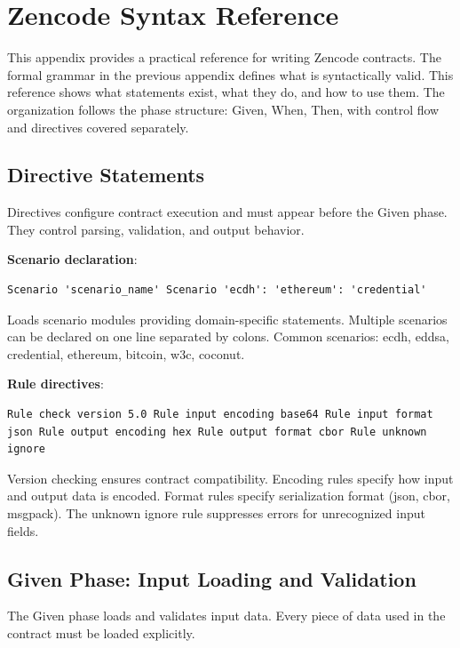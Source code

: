 \section{Zencode Syntax Reference}

This appendix provides a practical reference for writing Zencode
contracts. The formal grammar in the previous appendix defines what is
syntactically valid. This reference shows what statements exist, what
they do, and how to use them. The organization follows the phase
structure: Given, When, Then, with control flow and directives covered
separately.

\subsection{Directive Statements}

Directives configure contract execution and must appear before the
Given phase. They control parsing, validation, and output behavior.

\textbf{Scenario declaration}:

\begin{verbatim}
Scenario 'scenario_name' Scenario 'ecdh': 'ethereum': 'credential'
\end{verbatim}

Loads scenario modules providing domain-specific statements. Multiple
scenarios can be declared on one line separated by colons. Common
scenarios: ecdh, eddsa, credential, ethereum, bitcoin, w3c, coconut.

\textbf{Rule directives}:

\begin{verbatim}
Rule check version 5.0 Rule input encoding base64 Rule input format
json Rule output encoding hex Rule output format cbor Rule unknown
ignore
\end{verbatim}

Version checking ensures contract compatibility. Encoding rules
specify how input and output data is encoded. Format rules specify
serialization format (json, cbor, msgpack). The unknown ignore rule
suppresses errors for unrecognized input fields.

\subsection{Given Phase: Input Loading and Validation}

The Given phase loads and validates input data. Every piece of data
used in the contract must be loaded explicitly.

